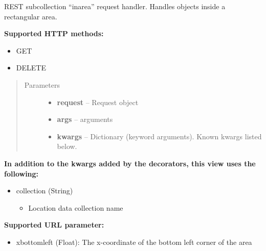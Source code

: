 \documentclass[letterpaper,10pt,english]{sphinxmanual}
\begin{document}

\begin{fulllineitems}
\label{codedoc/locdoc:lbd_backend.LBD_REST_locationdata.views.collection_inarea}
REST subcollection ``inarea'' request handler. Handles objects inside a rectangular area.

\textbf{Supported HTTP methods:}
\begin{itemize}
\item {} 
GET

\item {} 
DELETE

\end{itemize}
\begin{quote}\begin{description}
\item[{Parameters}] \leavevmode\begin{itemize}
\item {} 
\textbf{request} -- Request object

\item {} 
\textbf{args} -- arguments

\item {} 
\textbf{kwargs} -- Dictionary (keyword arguments). Known kwargs listed below.

\end{itemize}

\end{description}\end{quote}

\textbf{In addition to the kwargs added by the decorators, this view uses the following:}
\begin{itemize}
\item {} 
collection (String)
\begin{itemize}
\item {} 
Location data collection name

\end{itemize}

\end{itemize}

\textbf{Supported URL parameter:}
\begin{itemize}
\item {} 
xbottomleft (Float): The x-coordinate of the bottom left corner of the area


\end{itemize}
\end{fulllineitems}
\end{document}

